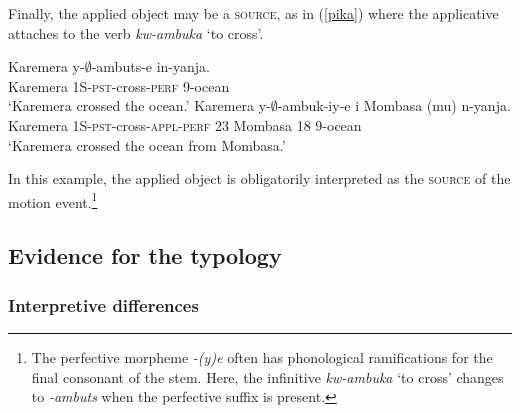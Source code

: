 \documentclass[output=paper]{langsci/langscibook}
\begin{document}
 Finally, the applied object may be a {\scshape source}, as in (\ref{pika}) where the applicative attaches to the verb \emph{kw-ambuka} `to cross'.
 \begin{exe}
	\ex\label{pika}\begin{xlist}
		\ex \gll Karemera y-$\emptyset$-ambuts-e in-yanja.\\
			Karemera 1S-{\scshape pst}-cross-{\scshape perf} 9-ocean\\
			\glt `Karemera crossed the ocean.'
		\ex\gll Karemera y-$\emptyset$-ambuk-iy-e  i Mombasa (mu) n-yanja.\\
			Karemera 1S-{\scshape pst}-cross-{\scshape appl-perf}  {\scshape 23} Mombasa \phantom{(}18 9-ocean\\
			\glt `Karemera crossed the ocean from Mombasa.'
		\end{xlist}
\end{exe}
In this example, the applied object is obligatorily interpreted as the {\scshape source} of the motion event.\footnote{The perfective morpheme \emph{-(y)e} often has phonological ramifications for the final consonant of the stem. Here, the infinitive \emph{kw-ambuka} `to cross' changes to \emph{-ambuts} when the perfective suffix is present.} 

 



\subsection{Evidence for the typology}%


\subsubsection{Interpretive differences}%
\end{document}
